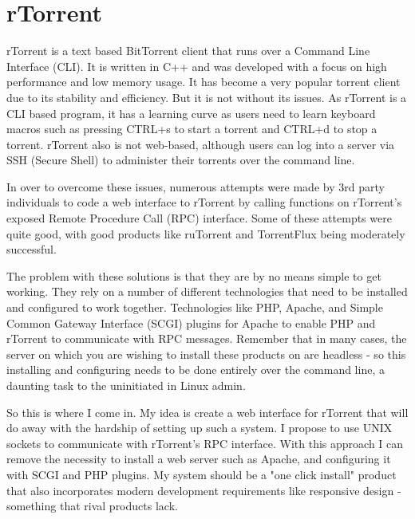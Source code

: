 
\section{rTorrent}
rTorrent is a text based BitTorrent client that runs over a Command Line Interface (CLI). It is written in C++ and was developed with a focus on high performance and low memory usage. It has become a very popular torrent client due to its stability and efficiency. But it is not without its issues. As rTorrent is a CLI based program, it has a learning curve as users need to learn keyboard macros such as pressing CTRL+s to start a torrent and CTRL+d to stop a torrent. rTorrent also is not web-based, although users can log into a server via SSH (Secure Shell) to administer their torrents over the command line. 

In over to overcome these issues, numerous attempts were made by 3rd party individuals to code a web interface to rTorrent by calling functions on rTorrent's exposed Remote Procedure Call (RPC) interface. Some of these attempts were quite good, with good products like ruTorrent\cite{ruTorrent} and TorrentFlux\cite{TorrentFlux} being moderately successful. 

The problem with these solutions is that they are by no means simple to get working. They rely on a number of different technologies that need to be installed and configured to work together. Technologies like PHP\cite{PHP}, Apache\cite{Apache}, and Simple Common Gateway Interface (SCGI) plugins for Apache to enable PHP and rTorrent to communicate with RPC messages. Remember that in many cases, the server on which you are wishing to install these products on are headless - so this installing and configuring needs to be done entirely over the command line, a daunting task to the uninitiated in Linux admin. 

So this is where I come in. My idea is create a web interface for rTorrent that will do away with the hardship of setting up such a system. I propose to use UNIX sockets to communicate with rTorrent's RPC interface. With this approach I can remove the necessity to install a web server such as Apache, and configuring it with SCGI and PHP plugins. My system should be a "one click install" product that also incorporates modern development requirements like responsive design - something that rival products lack.













